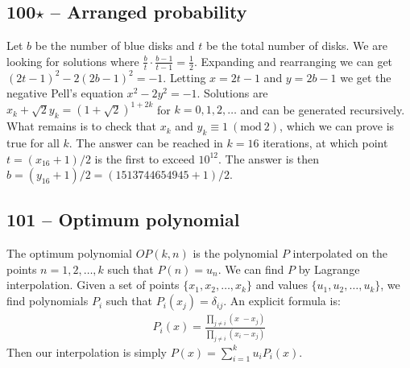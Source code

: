 \documentclass{article}
\newcommand{\Mod}[1]{\ (\mathrm{mod}\ #1)}
\begin{document}
\subsection*{100$\star$ -- Arranged probability} 
Let $b$ be the number of blue disks and $t$ be the total number of disks. 
We are looking for solutions where $\frac{b}{t} \cdot \frac{b-1}{t-1} = \frac{1}{2}$. 
Expanding and rearranging we can get $(2t-1)^2 - 2(2b-1)^2 = -1$. 
Letting $x = 2t-1$ and $y = 2b-1$ we get the negative Pell's equation $x^2 - 2y^2 = -1$. 
Solutions are $x_k + \sqrt{2} y_k = (1+\sqrt{2})^{1 + 2k}$ for $k = 0, 1, 2, \dotsc$ and can be generated recursively.
What remains is to check that $x_k$ and $y_k \equiv 1 \Mod{2}$, which we can prove is true for all $k$.
The answer can be reached in $k=16$ iterations, at which point $t = (x_{16}+1)/2$ is the first to exceed $10^{12}$.
The answer is then $b = (y_{16} + 1)/2 =  \boxed{(1513744654945 + 1)/2}$.

\subsection*{101 -- Optimum polynomial} 
The optimum polynomial $OP(k, n)$ is the polynomial $P$ interpolated on the points $n = 1, 2, \dotsc, k$ such that $P(n) = u_n$. 
We can find $P$ by Lagrange interpolation.
Given a set of points $\{x_1, x_2, \dotsc, x_k\}$ and values $\{u_1, u_2, \dotsc, u_k\}$, we find polynomials $P_i$ such that $P_i(x_j) = \delta_{ij}$. 
An explicit formula is:
\begin{align*}
	P_i(x) = \frac{\prod_{j \neq i}(x_{\phantom{i}} - x_j)}{\prod_{j \neq i}(x_i - x_j)}
\end{align*}
Then our interpolation is simply $P(x) = \sum\limits_{i=1}^k u_i P_i(x)$.
\end{document}
